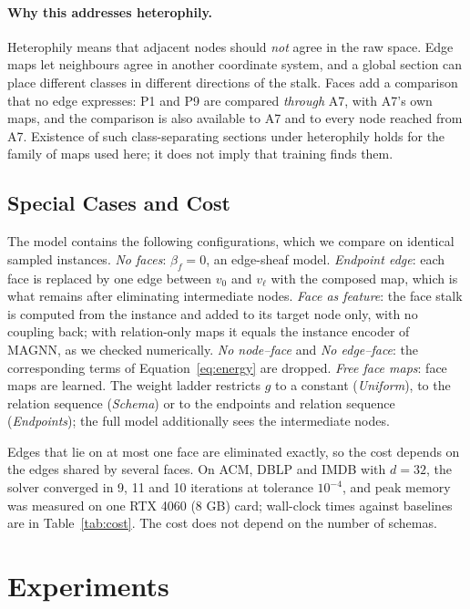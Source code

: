 \documentclass{article}
\begin{document}
\paragraph{Why this addresses heterophily.} Heterophily means that adjacent nodes should \emph{not} agree in the raw space. Edge maps let neighbours agree in another coordinate system, and a global section can place different classes in different directions of the stalk. Faces add a comparison that no edge expresses: P1 and P9 are compared \emph{through} A7, with A7's own maps, and the comparison is also available to A7 and to every node reached from A7. Existence of such class-separating sections under heterophily holds for the family of maps used here; it does not imply that training finds them.

\subsection{Special Cases and Cost}
\label{sec:cases}
The model contains the following configurations, which we compare on identical sampled instances. \emph{No faces}: $\beta_f=0$, an edge-sheaf model. \emph{Endpoint edge}: each face is replaced by one edge between $v_0$ and $v_\ell$ with the composed map, which is what remains after eliminating intermediate nodes. \emph{Face as feature}: the face stalk is computed from the instance and added to its target node only, with no coupling back; with relation-only maps it equals the instance encoder of MAGNN, as we checked numerically. \emph{No node--face} and \emph{No edge--face}: the corresponding terms of Equation~\eqref{eq:energy} are dropped. \emph{Free face maps}: face maps are learned. The weight ladder restricts $g$ to a constant (\emph{Uniform}), to the relation sequence (\emph{Schema}) or to the endpoints and relation sequence (\emph{Endpoints}); the full model additionally sees the intermediate nodes.

Edges that lie on at most one face are eliminated exactly, so the cost depends on the edges shared by several faces. On ACM, DBLP and IMDB with $d=32$, the solver converged in 9, 11 and 10 iterations at tolerance $10^{-4}$, and peak memory was measured on one RTX 4060 (8 GB) card; wall-clock times against baselines are in Table~\ref{tab:cost}. The cost does not depend on the number of schemas.

\section{Experiments}
\label{sec:experiments}
\end{document}

